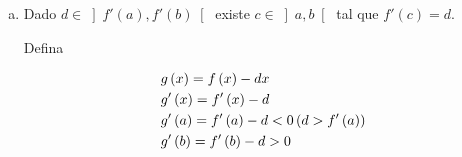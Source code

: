 \documentclass[11pt, oneside, a4paper]{gsm-l}
\begin{document}
\begin{enumerate}
\begin{sol}
\begin{enumerate}[(a)]
(é uma das possibilidades), analisemos dois casos:

\begin{enumerate}[(i)]
    \item $f'\left( a \right) < 0 < \displaystyle \frac{{f\left( b \right) - f\left( a \right)}}{{b - a}}$

    \item $\displaystyle \frac{{f\left( b \right) - f\left( a \right)}}{{b - a}} < 0 < f'\left( b \right)$
\end{enumerate}

Em:

\begin{enumerate}[(i)]
\item Temos

\begin{equation*}
g(x) = \left\{ \begin{array}{cl}\displaystyle
                        \frac{{f(x)  - f(a) }}{{x-a}} & \textrm{se } x \ne a\\
f'(a) & \textrm{se } x=a \end{array}\right.
\end{equation*}

$g$ é contínua, então,

\[
\begin{gathered}
g\left( a \right) = f'\left( a \right) < 0 \hfill \\
g\left( b \right) = \frac{{f\left( b \right) - f\left( a \right)}}{{b - a}} > 0 \hfill \\
\end{gathered}
\]

Então, $\exists x_1  \in \left] {a,b} \right[$ tal que $g\left( {x_1 } \right) = \displaystyle \frac{{f\left( {x_1 } \right) - f\left( a \right)}}{{x - a}} = 0$

Pelo TVM, $c \in \left] {a,b} \right[$ tal que $\displaystyle \frac{{f\left( {x_1 } \right) - f\left( a \right)}}{{x - a}} = f'\left( c \right)$.

\item Análogo.
\end{enumerate}

\item Dado $d \in \left] {f'\left( a \right),f'\left( b \right)} \right[$ existe $c \in \left] {a,b} \right[$ tal que $f'\left( c \right) = d$.

Defina

\[
\begin{gathered}
g\left( x \right) = f\left( x \right) - dx \hfill \\
g'\left( x \right) = f'\left( x \right) - d \hfill \\
                g'\left( a \right) = f'\left( a \right) - d < 0\left( {d > f'\left( a \right)} \right) \hfill \\
g'\left( b \right) = f'\left( b \right) - d > 0 \hfill \\
\end{gathered}
\]


\end{enumerate}
\end{sol}
\end{enumerate}
\end{document}
